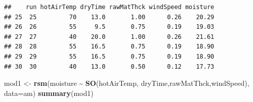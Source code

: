 \documentclass[
]{book}
\newenvironment{Shaded}{\begin{snugshade}}{\end{snugshade}}
\newcommand{\AttributeTok}[1]{\textcolor[rgb]{0.13,0.29,0.53}{#1}}
\newcommand{\FunctionTok}[1]{\textcolor[rgb]{0.13,0.29,0.53}{\textbf{#1}}}
\newcommand{\NormalTok}[1]{#1}
\newcommand{\OtherTok}[1]{\textcolor[rgb]{0.56,0.35,0.01}{#1}}
\newcommand{\SpecialCharTok}[1]{\textcolor[rgb]{0.81,0.36,0.00}{\textbf{#1}}}
\begin{document}
\begin{verbatim}
##    run hotAirTemp dryTime rawMatThck windSpeed moisture
## 25  25         70    13.0       1.00      0.26    20.29
## 26  26         55     9.5       0.75      0.19    19.03
## 27  27         40    20.0       1.00      0.26    21.61
## 28  28         55    16.5       0.75      0.19    18.90
## 29  29         55    16.5       0.75      0.19    18.90
## 30  30         40    13.0       0.50      0.12    17.73
\end{verbatim}

\begin{Shaded}
\begin{Highlighting}[]
\NormalTok{mod1 }\OtherTok{\textless{}{-}} \FunctionTok{rsm}\NormalTok{(moisture }\SpecialCharTok{\textasciitilde{}} \FunctionTok{SO}\NormalTok{(hotAirTemp, dryTime,rawMatThck,windSpeed), }\AttributeTok{data=}\NormalTok{am)}
\FunctionTok{summary}\NormalTok{(mod1)}
\end{Highlighting}
\end{Shaded}
\end{document}
